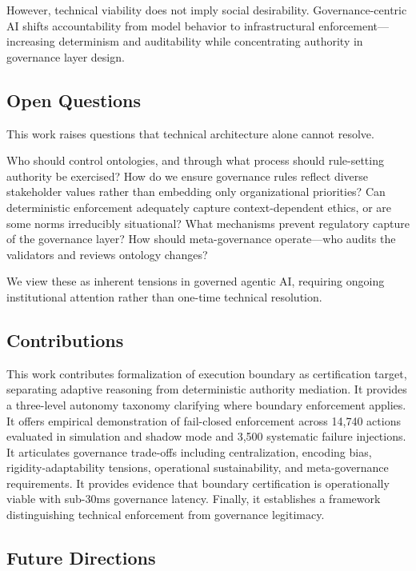 \documentclass[sigconf,nonacm]{acmart}
\begin{document}
However, technical viability does not imply social desirability. Governance-centric AI shifts accountability from model behavior to infrastructural enforcement---increasing determinism and auditability while concentrating authority in governance layer design.

\subsection{Open Questions}

This work raises questions that technical architecture alone cannot resolve.

Who should control ontologies, and through what process should rule-setting authority be exercised? How do we ensure governance rules reflect diverse stakeholder values rather than embedding only organizational priorities? Can deterministic enforcement adequately capture context-dependent ethics, or are some norms irreducibly situational? What mechanisms prevent regulatory capture of the governance layer? How should meta-governance operate---who audits the validators and reviews ontology changes?

We view these as inherent tensions in governed agentic AI, requiring ongoing institutional attention rather than one-time technical resolution.

\subsection{Contributions}

This work contributes formalization of execution boundary as certification target, separating adaptive reasoning from deterministic authority mediation. It provides a three-level autonomy taxonomy clarifying where boundary enforcement applies. It offers empirical demonstration of fail-closed enforcement across 14,740 actions evaluated in simulation and shadow mode and 3,500 systematic failure injections. It articulates governance trade-offs including centralization, encoding bias, rigidity-adaptability tensions, operational sustainability, and meta-governance requirements. It provides evidence that boundary certification is operationally viable with sub-30ms governance latency. Finally, it establishes a framework distinguishing technical enforcement from governance legitimacy.

\subsection{Future Directions}
\end{document}
